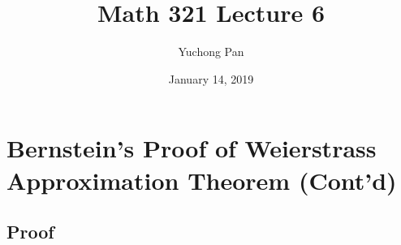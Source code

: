 \documentclass[letterpaper, reqno,11pt]{article}
\begin{document}
\title{Math 321 Lecture 6}
\author{Yuchong Pan}
\date{January 14, 2019}
\newtheorem{thm}{Theorem}
\newtheorem{defn}{Definition}
\newtheorem{exs}{Exercise}
\newtheorem*{remark}{Remark}
\newtheorem{claim}{Claim}
\newtheorem{cor}{Corollary}
\newtheorem{lemma}{Lemma}
\maketitle
%

\section{Bernstein's Proof of Weierstrass Approximation Theorem (Cont'd)}

\subsection{Proof}
\end{document}
